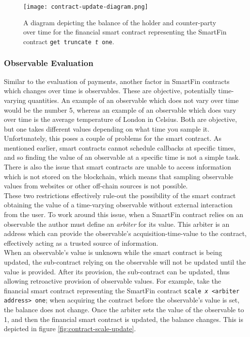 \begin{figure}[h]
    \centering
    \texttt{[image: contract-update-diagram.png]}
    \caption{A diagram depicting the balance of the holder and counter-party over time for the financial smart contract representing the SmartFin contract \texttt{get truncate \textit{t} one}.}
    \label{fig:contract-update}
\end{figure}

\subsubsection{Observable Evaluation}

Similar to the evaluation of payments, another factor in SmartFin contracts which changes over time is observables. These are objective, potentially time-varying quantities. An example of an observable which does not vary over time would be the number 5, whereas an example of an observable which does vary over time is the average temperature of London in Celsius. Both are objective, but one takes different values depending on what time you sample it. \\

Unfortunately, this poses a couple of problems for the smart contract. As mentioned earlier, smart contracts cannot schedule callbacks at specific times, and so finding the value of an observable at a specific time is not a simple task. There is also the issue that smart contracts are unable to access information which is not stored on the blockchain, which means that sampling observable values from websites or other off-chain sources is not possible. \\

These two restrictions effectively rule-out the possibility of the  smart contract obtaining the value of a time-varying observable without external interaction from the user. To work around this issue, when a SmartFin contract relies on an observable the author must define an \textit{arbiter} for its value. This arbiter is an address which can provide the observable's acquisition-time-value to the contract, effectively acting as a trusted source of information. \\

When an observable's value is unknown while the smart contract is being updated, the sub-contract relying on the observable will not be updated until the value is provided. After its provision, the sub-contract can be updated, thus allowing retroactive provision of observable values. For example, take the financial smart contract representing the SmartFin contract \texttt{scale \textit{x} <arbiter address> one}; when acquiring the contract before the observable's value is set, the balance does not change. Once the arbiter sets the value of the observable to 1, and then the financial smart contract is updated, the balance changes. This is depicted in figure \ref{fig:contract-scale-update}. \\

